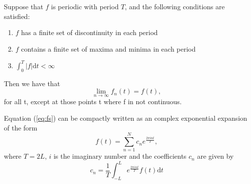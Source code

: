 \documentclass[../Main/thesis.tex]{subfiles}
\begin{document}
\begin{theorem}
Suppose that $f$ is periodic with period $T$, and the following conditions are satisfied:
\begin{enumerate}
\item $f$ has a finite set of discontinuity in each period
\item $f$ contains a finite set of maxima and minima in each period
\item $\int_{0}^{T}|f|\mathrm{d}t <\infty$
\end{enumerate}

Then we have that 
\begin{equation}
\lim_{n\rightarrow \infty} f_{n}(t) = f(t) ,\nonumber
\end{equation}
for all t, except at those points t where f in not continuous.
\end{theorem}
Equation (\ref{eq:fs}) can be compactly written as an complex exponential expansion of the form
\begin{equation}\label{eq:fse}
f(t) = \sum_{n=1}^{N} c_{n}e^{\frac{2\pi i n t}{T}},
\end{equation}
where $T = 2L$,  $i$ is the imaginary number and the coefficients $c_{n}$ are given by
\begin{equation}
c_{n} = \frac{1}{T}\int_{-L}^{L}e^{\frac{2\pi i n t}{T}}f(t)\mathrm{d}t
\end{equation}
\end{document}
